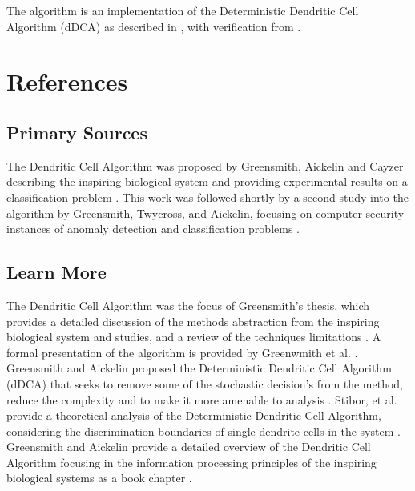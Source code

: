 \documentclass[a4paper, 11pt]{article}
\begin{document}
The algorithm is an implementation of the Deterministic Dendritic Cell Algorithm (dDCA) as described in \cite{Stibor2009, Greensmith2008}, with verification from \cite{Greensmith2006a}.




\section{References}
\label{sec:references}

% 
% 
\subsection{Primary Sources}
The Dendritic Cell Algorithm was proposed by Greensmith, Aickelin and Cayzer describing the inspiring biological system and providing experimental results on a classification problem \cite{Greensmith2005}.
This work was followed shortly by a second study into the algorithm by Greensmith, Twycross, and Aickelin, focusing on computer security instances of anomaly detection and classification problems \cite{Greensmith2006}.

% 
% 
\subsection{Learn More}
The Dendritic Cell Algorithm was the focus of Greensmith's thesis, which provides a detailed discussion of the methods abstraction from the inspiring biological system and studies, and a review of the techniques limitations \cite{Greensmith2007}. 
A formal presentation of the algorithm is provided by Greenwmith et al. \cite{Greensmith2006a}.
Greensmith and Aickelin proposed the Deterministic Dendritic Cell Algorithm (dDCA) that seeks to remove some of the stochastic decision's from the method, reduce the complexity and to make it more amenable to analysis \cite{Greensmith2008}.
Stibor, et al. provide a theoretical analysis of the Deterministic Dendritic Cell Algorithm, considering the discrimination boundaries of single dendrite cells in the system \cite{Stibor2009}. 
Greensmith and Aickelin provide a detailed overview of the Dendritic Cell Algorithm focusing in the information processing principles of the inspiring biological systems as a book chapter \cite{Greensmith2009}.
\end{document}
